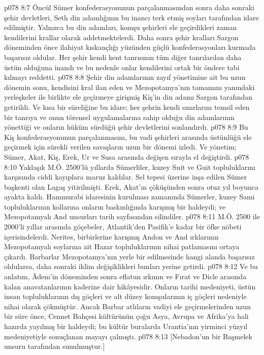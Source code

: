 \vs p078 8:7 Öncül Sümer konfederasyonunun parçalanmasından sonra daha sonraki şehir devletleri, Seth din adamlığının bu inancı terk etmiş soyları tarafından idare edilmiştir. Yalnızca bu din adamları, komşu şehirleri ele geçirdikleri zaman kendilerini krallar olarak addetmektelerdi. Daha sonra şehir kralları Sargon döneminden önce ilahiyat kıskançlığı yüzünden güçlü konfederasyonları kurmada başarısız oldular. Her şehir kendi kent tanrısının tüm diğer tanrılardan daha üstün olduğuna inandı ve bu nedenle onlar kendilerini ortak bir öndere tabi kılmayı reddetti.
\vs p078 8:8 Şehir din adamlarının zayıf yönetimine ait bu uzun dönemin sonu, kendisini kral ilan eden ve Mezopotamya’nın tamamını yanındaki yerleşkeler ile birlikte ele geçirmeye girişmiş Kiş’in din adamı Sargon tarafından getirildi. Ve kısa bir süreliğine bu idare; her şehrin kendi sınırlarını temsil eden bir tanrıya ve onun törensel uygulamalarına sahip olduğu din adamlarının yönettiği ve onların hüküm sürdüğü şehir devletlerini sonlandırdı.
\vs p078 8:9 Bu Kiş konfederasyonunun parçalanmasını, bu vadi şehirleri arasında üstünlüğü ele geçirmek için sürekli verilen savaşların uzun bir dönemi izledi. Ve yönetim; Sümer, Akat, Kiş, Erek, Ur ve Susa arasında değişen sırayla el değiştirdi.
\vs p078 8:10 Yaklaşık M.Ö. 2500’lü yıllarda Sümerliler, kuzey Suit ve Guit topluluklarını karşısında ciddi kayıplara maruz kaldılar. Sel tepesi üzerine inşa edilen Sümer başkenti olan Lagaş yitirilmişti. Erek, Akat’ın çöküşünden sonra otuz yıl boyunca ayakta kaldı. Hammurabi idaresinin kurulması zamanında Sümerler, kuzey Sami topluluklarının kollarına onların baskınlığında karışmış bir haldeydi; ve Mezopotamyalı And unsurları tarih sayfasından silindiler.
\vs p078 8:11 M.Ö. 2500 ile 2000’li yıllar arasında göçebeler, Atlantik’den Pasifik’e kadar bir öfke nöbeti içerisindelerdi. Nerites, birbirlerine karışmış Andon ve And ırklarının Mezopotamyalı soylarına ait Hazar topluluklarının nihai patlamasını ortaya çıkardı. Barbarlar Mezopotamya’nın yerle bir edilmesinde hangi alanda başarısız oldularsa, daha sonraki iklim değişiklikleri bunları yerine getirdi.
\vs p078 8:12 Ve bu anlatım, Âdem’in döneminden sonra eflatun ırkının ve Fırat ve Dicle arasında kalan anavatanlarının kaderine dair hikâyesidir. Onların tarihi medeniyeti, üstün insan topluluklarının dış göçleri ve alt düzey komşularının iç göçleri nedeniyle nihai olarak çökmüştür. Ancak Barbar atlıların vadiyi ele geçirmelerinden uzun bir süre önce, Cennet Bahçesi kültürünün çoğu Asya, Avrupa ve Afrika’ya hali hazırda yayılmış bir haldeydi; bu kültür buralarda Urantia’nın yirminci yüzyıl medeniyetiyle sonuçlanan mayayı çalmıştı.
\vs p078 8:13 [Nebadon’un bir Başmelek unsuru tarafından sunulmuştur.]
